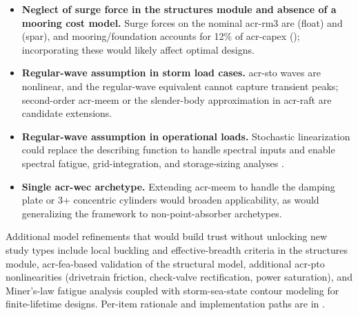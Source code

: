 \begin{itemize}[leftmargin=*]
    \item \textbf{Neglect of surge force in the structures module and absence of a mooring cost model.} Surge forces on the nominal \gls{acr-rm3} are \resultsAOR[surgeForceFloatNominal] (float) and \resultsAOR[surgeForceSparNominal] (spar), and mooring/foundation accounts for 12\% of \gls{acr-capex} (); incorporating these would likely affect optimal designs.
    \item \textbf{Regular-wave assumption in storm load cases.} \gls{acr-sto} waves are nonlinear, and the regular-wave equivalent cannot capture transient peaks; second-order \gls{acr-meem} \citep{cong_novel_2020,mavrakos_second-order_2009} or the slender-body approximation in \gls{acr-raft} \citep{carmo_slender-body_2025} are candidate extensions.
    \item \textbf{Regular-wave assumption in operational loads.} Stochastic linearization \citep{da_silva_statistical_2020,da_silva_stochastic_2023,kluger_synergistic_2017,folley_spectral-domain_2016,spanos_efficient_2016,neshat_enhancing_2024} could replace the describing function to handle spectral inputs and enable spectral fatigue, grid-integration, and storage-sizing analyses \citep{mccabe_wec_2025}.
    \item \textbf{Single \gls{acr-wec} archetype.} Extending \gls{acr-meem} to handle the damping plate or 3+ concentric cylinders \citep{best_openflash_2026,bimali_matrix_2026} would broaden applicability, as would generalizing the framework to non-point-absorber archetypes.
\end{itemize}
    
    Additional model refinements that would build trust without unlocking new study types include local buckling and effective-breadth criteria in the structures module, \gls{acr-fea}-based validation of the structural model, additional \gls{acr-pto} nonlinearities (drivetrain friction, check-valve rectification, power saturation), and Miner's-law fatigue analysis coupled with storm-sea-state contour modeling for finite-lifetime designs.
    Per-item rationale and implementation paths are in \citet{mccabe_dissertation_2026}.
\fi

\ifdefined\DISSERTATION
